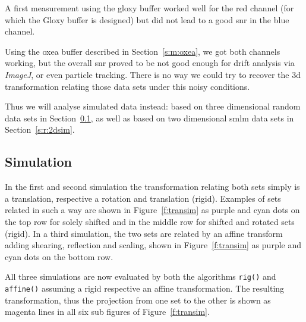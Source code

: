 \documentclass[11pt, a4paper, oneside, twocolumn]{report}
\renewcommand{\tt}{\texttt}
\newcommand{\e}{\emph}
\newcommand{\x}[1]{#1\index{#1}}
\begin{document}
A first measurement using the \gls{gloxy} buffer worked well for the
red channel (for which the Gloxy buffer is designed) but did not lead
to a good \gls{snr} in the blue channel.

Using the \gls{oxea} buffer described in Section~\ref{s:m:oxea}, we
got both channels working, but the overall \gls{snr} proved to be not
good enough for drift analysis via \e{ImageJ}, or even \x{particle
tracking}. There is no way we could try to recover the 3d
transformation relating those data sets under this noisy conditions.

Thus we will analyse simulated data instead: based on three
dimensional random data sets in Section~\ref{s:r:3dsim}, as well as
based on two dimensional \gls{smlm} data sets in
Section~\ref{s:r:2dsim}.


\subsection{Simulation}\label{s:r:3dsim}

In the first and second simulation the transformation relating both
sets simply is a translation, respective a rotation and translation
(rigid). Examples of sets related in such a way are shown in
Figure~\ref{f:transim} as purple and cyan dots on the top row for
solely shifted and in the middle row for shifted and rotated sets
(rigid). In a third simulation, the two sets are related by an affine
transform adding shearing, reflection and scaling, shown in
Figure~\ref{f:transim} as purple and cyan dots on the bottom row.

All three simulations are now evaluated by both the algorithms
\tt{rig()} and \tt{affine()} assuming a rigid respective an affine
transformation. The resulting transformation, thus the projection from
one set to the other is shown as magenta lines in all six sub figures
of Figure~\ref{f:transim}.
\end{document}
